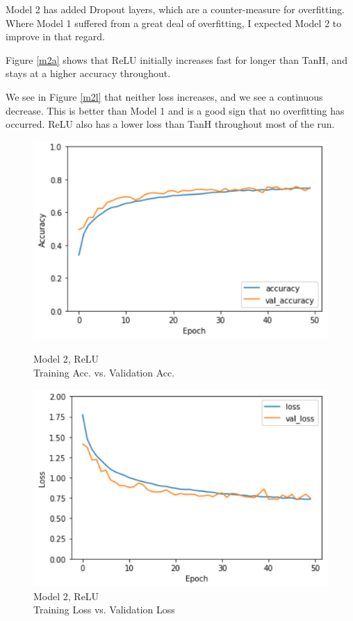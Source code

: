 \documentclass[a4paper, 11pt]{article}
\begin{document}
Model 2 has added Dropout layers, which are a counter-measure for overfitting. Where Model 1 suffered from a great deal of overfitting, I expected Model 2 to improve in that regard.

Figure \ref{m2a} shows that ReLU initially increases fast for longer than TanH, and stays at a higher accuracy throughout.

We see in Figure \ref{m2l} that neither loss increases, and we see a continuous decrease. This is better than Model 1 and is a good sign that no overfitting has occurred. ReLU also has a lower loss than TanH throughout most of the run.

\begin{figure}[h]
\begin{minipage}{0.45\textwidth}
\captionsetup{justification=centering}
\centering
\includegraphics[scale=0.45]{2overfita}
\caption[caption]{Model 2, ReLU \\ Training Acc. vs. Validation Acc.}
\label{m2oa} %
\end{minipage}
\begin{minipage}{0.45\textwidth}
\captionsetup{justification=centering}
\centering
\includegraphics[scale=0.45]{2overfitl}
\caption{Model 2, ReLU\\ Training Loss vs. Validation Loss}
\label{m2ol}%
\end{minipage}
\end{figure}
\end{document}
